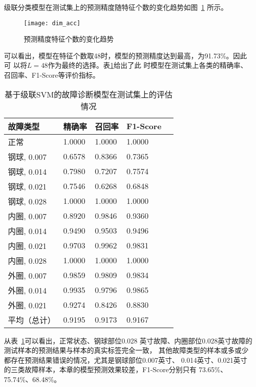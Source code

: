 级联分类模型在测试集上的预测精度随特征个数的变化趋势如图~\ref{fig:dim_acc}
所示。
\begin{figure}[ht]
  \centering
  \texttt{[image: dim\_acc]}
  \caption{预测精度特征个数的变化趋势}
  \label{fig:dim_acc}
\end{figure}

可以看出，模型在特征个数取48时，模型的预测精度达到最高，为91.73\%。因此可
以将$L=48$作为最终的选择。表\ref{tab:chap2:classification_report}给出了此
时模型在测试集上各类的精确率、召回率、F1-Score等评价指标。
\begin{table}[htb]
  \centering
  \begin{minipage}[t]{0.8\linewidth} %
  \caption{基于级联SVM的故障诊断模型在测试集上的评估情况}
  \label{tab:chap2:classification_report}
    \begin{tabularx}{\linewidth}{XXXXX}
      \toprule[1.5pt]
        故障类型    & 精确率 & 召回率 & F1-Score \\
      \midrule[1pt]
        正常        & 1.0000 & 1.0000 & 1.0000 \\
        钢球, 0.007 & 0.6578 & 0.8366 & 0.7365 \\
        钢球, 0.014 & 0.7980 & 0.7207 & 0.7574 \\
        钢球, 0.021 & 0.7546 & 0.6268 & 0.6848 \\
        钢球, 0.028 & 1.0000 & 1.0000 & 1.0000 \\
        内圈, 0.007 & 0.8920 & 0.9846 & 0.9360 \\
        内圈, 0.014 & 0.9490 & 0.9503 & 0.9496 \\
        内圈, 0.021 & 0.9703 & 0.9962 & 0.9831 \\
        内圈, 0.028 & 1.0000 & 1.0000 & 1.0000 \\
        外圈, 0.007 & 0.9859 & 0.9809 & 0.9834 \\
        外圈, 0.014 & 0.9935 & 0.9796 & 0.9865 \\
        外圈, 0.021 & 0.9274 & 0.8426 & 0.8830 \\
      \midrule[1pt]
        平均（总计）& 0.9195 & 0.9173 & 0.9167 \\
      \bottomrule[1.5pt]
    \end{tabularx}
  \end{minipage}
\end{table}

从表~\ref{tab:chap2:classification_report}可以看出，正常状态、钢球部位0.028
英寸故障、内圈部位0.028英寸故障的测试样本的预测结果与样本的真实标签完全一致，
其他故障类型的样本或多或少都存在预测结果错误的情况，尤其是钢球部位0.007英寸、
0.014英寸、0.021英寸的三类故障样本，本章的模型预测效果较差，F1-Score分别只有
73.65\%、75.74\%、68.48\%。

